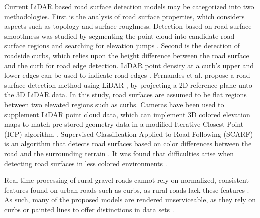 \documentclass[journal,onecolumn]{IEEEtran}
\begin{document}
	{Current LiDAR based road surface detection models may be categorized into two methodologies. First is the analysis of road surface properties, which considers aspects such as topology and surface roughness. Detection based on road surface smoothness was studied by segmenting the point cloud into candidate road surface regions and searching for elevation jumps \cite{liu_new_2013}. Second is the detection of roadside curbs, which relies upon the height difference between the road surface and the curb for road edge detection. LiDAR point density at a curb's upper and lower edges can be used to indicate road edges \cite{ibrahim_curb-based_2012}. Fernandes et al. propose a road surface detection method using LiDAR \cite{fernandes_road_2014}, by projecting a 2D reference plane unto the 3D LiDAR data. In this study, road surfaces are assumed to be flat regions between two elevated regions such as curbs. Cameras have been used to supplement LiDAR point cloud data, which can implement 3D colored elevation maps to match pre-stored geometry data in a modified Iterative Closest Point (ICP) algorithm \cite{manz_detection_2011}. Supervised Classification Applied to Road Following (SCARF) is an algorithm that detects road surfaces based on color differences between the road and the surrounding terrain \cite{crisman_scarf_1993}. It was found that difficulties arise when detecting road surfaces in less colored environments \cite{crisman_scarf_1993,manz_detection_2011}.}
	
	{Real time processing of rural gravel roads cannot rely on normalized, consistent features found on urban roads such as curbs, as rural roads lack these features \cite{skorseth_gravel_nodate}. As such, many of the proposed models are rendered unserviceable, as they rely on curbs or painted lines to offer distinctions in data sets \cite{yadav_extraction_2017,liu_new_2013,qiu_fast_2016,fernandes_road_2014,seker_experiments_nodate,yang_semi-automated_2013,miyazaki_line-based_2014,hervieu_road_2013,smadja_road_nodate}.}
	
\end{document}
